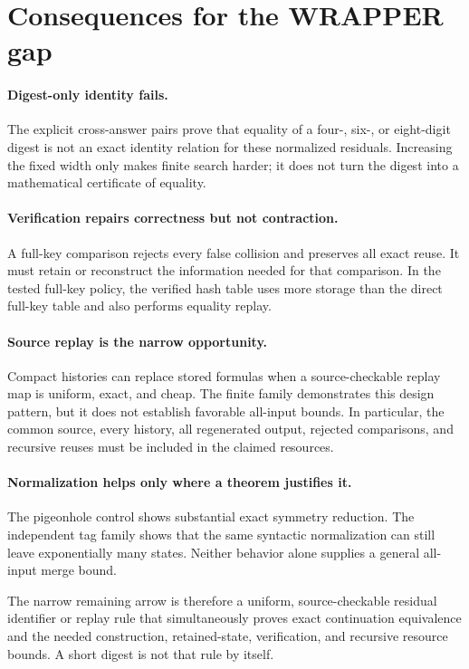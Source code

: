 \documentclass[11pt]{article}
\begin{document}
\section{Consequences for the WRAPPER gap}

\paragraph{Digest-only identity fails.}
The explicit cross-answer pairs prove that equality of a four-, six-, or
eight-digit digest is not an exact identity relation for these normalized
residuals.  Increasing the fixed width only makes finite search harder; it
does not turn the digest into a mathematical certificate of equality.

\paragraph{Verification repairs correctness but not contraction.}
A full-key comparison rejects every false collision and preserves all exact
reuse.  It must retain or reconstruct the information needed for that
comparison.  In the tested full-key policy, the verified hash table uses more
storage than the direct full-key table and also performs equality replay.

\paragraph{Source replay is the narrow opportunity.}
Compact histories can replace stored formulas when a source-checkable replay
map is uniform, exact, and cheap.  The finite family demonstrates this design
pattern, but it does not establish favorable all-input bounds.  In particular,
the common source, every history, all regenerated output, rejected
comparisons, and recursive reuses must be included in the claimed resources.

\paragraph{Normalization helps only where a theorem justifies it.}
The pigeonhole control shows substantial exact symmetry reduction.  The
independent tag family shows that the same syntactic normalization can still
leave exponentially many states.  Neither behavior alone supplies a general
all-input merge bound.

The narrow remaining arrow is therefore a uniform, source-checkable residual
identifier or replay rule that simultaneously proves exact continuation
equivalence and the needed construction, retained-state, verification, and
recursive resource bounds.  A short digest is not that rule by itself.
\end{document}
